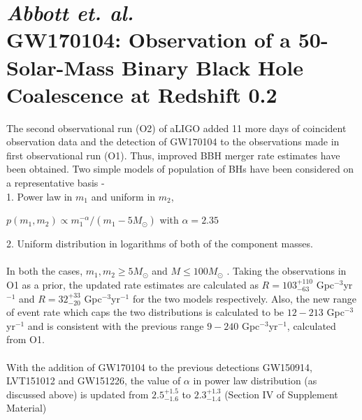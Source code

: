 \documentclass{article}
\numberwithin{equation}{section}
\begin{document}
\section*{\normalsize{\textit{Abbott et. al.\\}}\small{GW170104: Observation of a 50-Solar-Mass Binary Black Hole Coalescence at Redshift 0.2}}
The second observational run (O2) of aLIGO added 11 more days of coincident observation data and the detection of GW170104 to the observations made in first observational run (O1). Thus, improved BBH merger rate estimates have been obtained. Two simple models of population of BHs have been considered on a representative basis -\\
1. Power law in $m_1$ and uniform in $m_2$\cite{83_salpeter1955luminosity},
\begin{center}
	$p(m_1,m_2) \propto m_1^{-\alpha}/(m_1-5M_\odot)$ with $\alpha = 2.35$\\
\end{center}
2. Uniform distribution in logarithms of both of the component masses.\cite{5_PhysRevX.6.041015,8_abbott2016rate}\\
\\
In both the cases, $m_1,m_2\geqslant 5M_\odot$ and $M\leqslant100M_\odot$ \cite{8_abbott2016rate}. Taking the observations in O1 as a prior, the updated rate estimates are calculated as $R = 103^{+110}_{-63}$ Gpc$^{-3}$yr$^{-1}$ and $R = 32^{+33}_{-20}$ Gpc$^{-3}$yr$^{-1}$ for the two models respectively\cite{5_PhysRevX.6.041015}. Also, the new range of event rate which caps the two distributions is calculated to be $12 - 213$ Gpc$^{-3}$yr$^{-1}$ and is consistent with the previous range $9 - 240$ Gpc$^{-3}$yr$^{-1}$, calculated from O1\cite{5_PhysRevX.6.041015,8_abbott2016rate}.\\
\\
With the addition of GW170104 to the previous detections GW150914, LVT151012 and GW151226, the value of $\alpha$ in power law distribution (as discussed above) is updated from $2.5^{+1.5}_{-1.6}$ to $2.3^{+1.3}_{-1.4}$ (Section IV of Supplement Material\cite{1})
\end{document}
